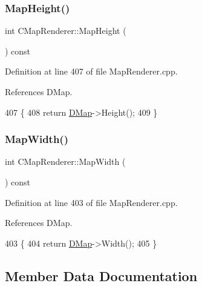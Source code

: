 \subsubsection{\texorpdfstring{Map\+Height()}{MapHeight()}}
{\footnotesize\ttfamily int C\+Map\+Renderer\+::\+Map\+Height (\begin{DoxyParamCaption}{ }\end{DoxyParamCaption}) const}



Definition at line 407 of file Map\+Renderer.\+cpp.



References D\+Map.


\begin{DoxyCode}
407                                  \{
408     \textcolor{keywordflow}{return} \hyperlink{classCMapRenderer_ab9a199c61aa1c87a3248af3085d8ba52}{DMap}->Height();
409 \}
\end{DoxyCode}
\hypertarget{classCMapRenderer_a4b63ead9be943cbe40b936fa224dc826}{}\label{classCMapRenderer_a4b63ead9be943cbe40b936fa224dc826} 
\subsubsection{\texorpdfstring{Map\+Width()}{MapWidth()}}
{\footnotesize\ttfamily int C\+Map\+Renderer\+::\+Map\+Width (\begin{DoxyParamCaption}{ }\end{DoxyParamCaption}) const}



Definition at line 403 of file Map\+Renderer.\+cpp.



References D\+Map.


\begin{DoxyCode}
403                                 \{
404     \textcolor{keywordflow}{return} \hyperlink{classCMapRenderer_ab9a199c61aa1c87a3248af3085d8ba52}{DMap}->Width();
405 \}
\end{DoxyCode}


\subsection{Member Data Documentation}
\hypertarget{classCMapRenderer_a5916c26aa5bedf8367a8f3f7efb457bf}{}\label{classCMapRenderer_a5916c26aa5bedf8367a8f3f7efb457bf} 
